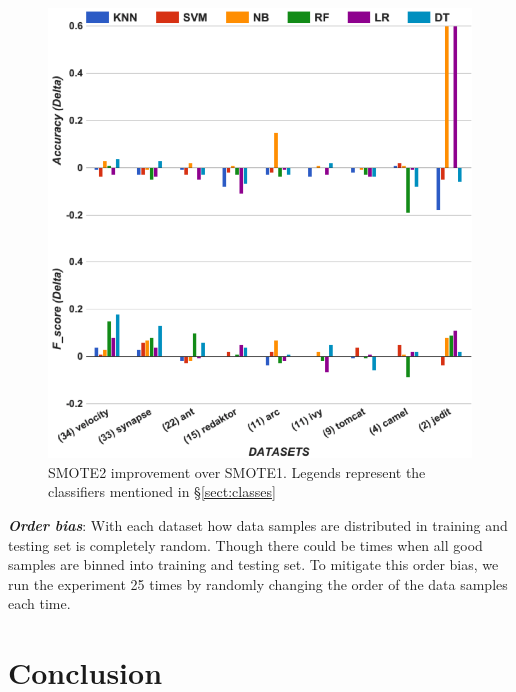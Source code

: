 \documentclass[10pt,conference]{IEEEtran}
\theoremstyle{break}
\theoremstyle{break}
\newcommand{\tion}[1]{{\S}\ref{sect:#1}}
\begin{document}
\begin{figure}[!htbp]
\begin{minipage}{\linewidth}
\centering
        \includegraphics[width=.95\linewidth]{./fig/acc_f_tuned.png}
    \end{minipage}%
    \caption{SMOTE2 improvement over SMOTE1. Legends represent the classifiers mentioned in \tion{classes}}
    \label{fig:threats}
\vspace{-0.5cm}
\end{figure}

\textbf{\textit{Order bias}}: With each dataset how data samples are distributed in training and testing set is completely random. Though there could be times when all good samples are binned into training and testing set. To mitigate this order bias, we run
the experiment 25 times by randomly changing the order of the data samples each time.

\section{Conclusion}
\label{sect:conclusion}
\end{document}
